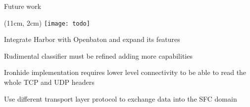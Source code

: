 \begin{frame}{Future work}

  \begin{textblock*}{1cm}(11cm, 2cm)
    \texttt{[image: todo]}
  \end{textblock*}

  Integrate Harbor with Openbaton and expand its features

  \vfill{}

  Rudimental classifier must be refined adding more capabilities

  \vfill{}

  Ironhide implementation requires lower level connectivity to be able to read
  the whole TCP and UDP headers

  \vfill{}

  Use different transport layer protocol to exchange data into the SFC domain

  \vfill{}

\end{frame}